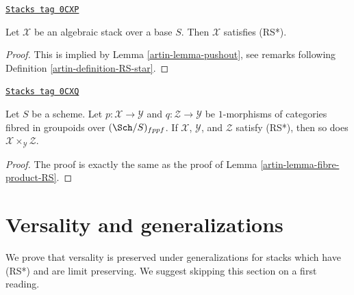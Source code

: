 \begin{lemma}
\label{artin-lemma-algebraic-stack-RS-star}
\href{https://stacks.math.columbia.edu/tag/0CXP}{\texttt{Stacks tag 0CXP}}

Let $\mathcal{X}$ be an algebraic stack over a base $S$.
Then $\mathcal{X}$ satisfies (RS*).
\end{lemma}

\begin{proof}

This is implied by Lemma \ref{artin-lemma-pushout}, see
remarks following Definition \ref{artin-definition-RS-star}.
\end{proof}

\begin{lemma}
\label{artin-lemma-fibre-product-RS-star}
\href{https://stacks.math.columbia.edu/tag/0CXQ}{\texttt{Stacks tag 0CXQ}}

Let $S$ be a scheme. Let $p : \mathcal{X} \to \mathcal{Y}$ and
$q : \mathcal{Z} \to \mathcal{Y}$ be $1$-morphisms of categories
fibred in groupoids over $(\Sch/S)_{fppf}$. If $\mathcal{X}$, $\mathcal{Y}$,
and $\mathcal{Z}$ satisfy (RS*), then so
does $\mathcal{X} \times_\mathcal{Y} \mathcal{Z}$.
\end{lemma}

\begin{proof}

The proof is exactly the same as the proof of
Lemma \ref{artin-lemma-fibre-product-RS}.
\end{proof}

\section{Versality and generalizations}
\label{artin-section-generalize-versality}
We prove that versality is preserved under generalizations
for stacks which have (RS*) and are limit preserving.
We suggest skipping this section on a first reading.

